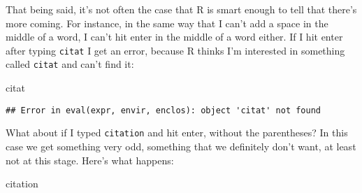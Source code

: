 \documentclass[]{book}
\newenvironment{Shaded}{\begin{snugshade}}{\end{snugshade}}
\newcommand{\NormalTok}[1]{#1}
\begin{document}
That being said, it's not often the case that R is smart enough to tell that there's more coming. For instance, in the same way that I can't add a space in the middle of a word, I can't hit enter in the middle of a word either. If I hit enter after typing \texttt{citat} I get an error, because R thinks I'm interested in something called \texttt{citat} and can't find it:

\begin{Shaded}
\begin{Highlighting}[]
\NormalTok{citat}
\end{Highlighting}
\end{Shaded}

\begin{verbatim}
## Error in eval(expr, envir, enclos): object 'citat' not found
\end{verbatim}

What about if I typed \texttt{citation} and hit enter, without the parentheses? In this case we get something very odd, something that we definitely don't want, at least not at this stage. Here's what happens:

\begin{Shaded}
\begin{Highlighting}[]
\NormalTok{citation}
\end{Highlighting}
\end{Shaded}
\end{document}
